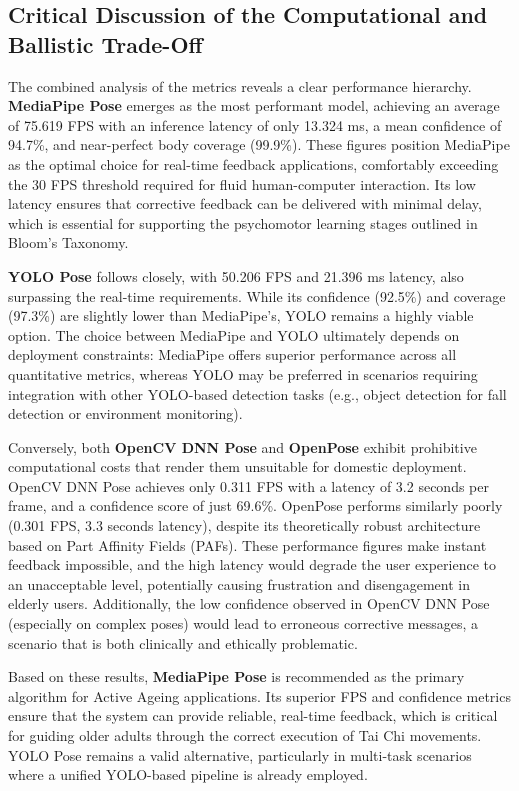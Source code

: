 \documentclass[a4paper,11pt]{article}
\begin{document}
\subsection{Critical Discussion of the Computational and Ballistic Trade-Off}

The combined analysis of the metrics reveals a clear performance hierarchy. \textbf{MediaPipe Pose} emerges as the most performant model, achieving an average of 75.619 FPS with an inference latency of only 13.324 ms, a mean confidence of 94.7\%, and near-perfect body coverage (99.9\%). These figures position MediaPipe as the optimal choice for real-time feedback applications, comfortably exceeding the 30 FPS threshold required for fluid human-computer interaction. Its low latency ensures that corrective feedback can be delivered with minimal delay, which is essential for supporting the psychomotor learning stages outlined in Bloom's Taxonomy.

\textbf{YOLO Pose} follows closely, with 50.206 FPS and 21.396 ms latency, also surpassing the real-time requirements. While its confidence (92.5\%) and coverage (97.3\%) are slightly lower than MediaPipe's, YOLO remains a highly viable option. The choice between MediaPipe and YOLO ultimately depends on deployment constraints: MediaPipe offers superior performance across all quantitative metrics, whereas YOLO may be preferred in scenarios requiring integration with other YOLO-based detection tasks (e.g., object detection for fall detection or environment monitoring).

Conversely, both \textbf{OpenCV DNN Pose} and \textbf{OpenPose} exhibit prohibitive computational costs that render them unsuitable for domestic deployment. OpenCV DNN Pose achieves only 0.311 FPS with a latency of 3.2 seconds per frame, and a confidence score of just 69.6\%. OpenPose performs similarly poorly (0.301 FPS, 3.3 seconds latency), despite its theoretically robust architecture based on Part Affinity Fields (PAFs). These performance figures make instant feedback impossible, and the high latency would degrade the user experience to an unacceptable level, potentially causing frustration and disengagement in elderly users. Additionally, the low confidence observed in OpenCV DNN Pose (especially on complex poses) would lead to erroneous corrective messages, a scenario that is both clinically and ethically problematic.

Based on these results, \textbf{MediaPipe Pose} is recommended as the primary algorithm for Active Ageing applications. Its superior FPS and confidence metrics ensure that the system can provide reliable, real-time feedback, which is critical for guiding older adults through the correct execution of Tai Chi movements. YOLO Pose remains a valid alternative, particularly in multi-task scenarios where a unified YOLO-based pipeline is already employed.
\end{document}
